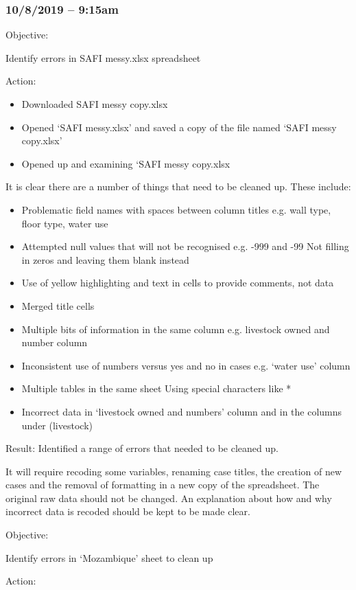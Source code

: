 \documentclass{article}
\begin{document}
\subsubsection*{10/8/2019 – 9:15am}
Objective:\par
Identify errors in SAFI messy.xlsx spreadsheet\par
Action:
\begin{itemize}
\item Downloaded SAFI messy copy.xlsx
\item Opened ‘SAFI messy.xlsx’ and saved a copy of the file named ‘SAFI messy copy.xlsx’
\item Opened up and examining ‘SAFI messy copy.xlsx
\end{itemize}
It is clear there are a number of things that need to be cleaned up. These include:\par
\begin{itemize}
\item Problematic field names with spaces between column titles e.g. wall type, floor type, water use
\item Attempted null values that will not be recognised e.g. -999 and -99 
Not filling in zeros and leaving them blank instead
\item Use of yellow highlighting and text in cells to provide comments, not data
\item Merged title cells
\item Multiple bits of information in the same column e.g. livestock owned and number column
\item Inconsistent use of numbers versus yes and no in cases e.g. ‘water use’ column
\item Multiple tables in the same sheet
Using special characters like *
\item Incorrect data in ‘livestock owned and numbers’ column and in the columns under (livestock)
\end{itemize}
Result: Identified a range of errors that needed to be cleaned up.\par
It will require recoding some variables, renaming case titles, the creation of new cases and the removal of formatting in a new copy of the spreadsheet. The original raw data should not be changed. An explanation about how and why incorrect data is recoded should be kept to be made clear.\par
Objective:\par 
Identify errors in ‘Mozambique’ sheet to clean up\par
Action: 
\end{document}
